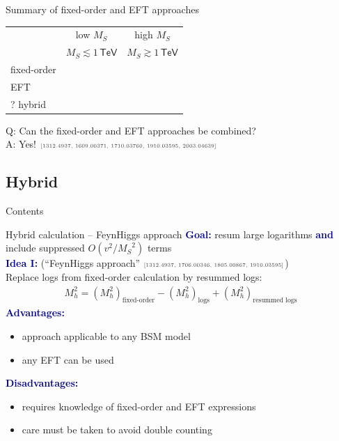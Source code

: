 \documentclass[hyperref={pdfpagelabels=false},ngerman]{beamer}
\newcommand{\cmark}{\ding{51}}%
\newcommand{\xmark}{\ding{55}}%
\newcommand{\eh}[1]{\,\mathsf{#1}}
\newcommand{\ok}{\textcolor{darkgreen}{\cmark}}
\newcommand{\notok}{\textcolor{red}{\xmark}}
\newcommand{\MS}{\ensuremath{M_S}}
\newcommand{\mycite}[1]{\ensuremath{\text{\textcolor{darkgray}{\tiny [#1]}}}}
\renewcommand{\emph}[1]{\textbf{\textcolor{darkblue}{#1}}}
\begin{document}
\begin{frame}{Summary of fixed-order and EFT approaches}
  \begin{center}
    \begin{tabular}{lcc}
      \toprule
                  & low $\MS$ & high $\MS$ \\
                  & $\MS \lesssim 1\eh{TeV}$ & $\MS \gtrsim 1\eh{TeV}$ \\
      \midrule
      fixed-order & \ok       & \notok     \\
      EFT         & \notok    & \ok        \\
      ? hybrid    & \ok       & \ok        \\
      \bottomrule
    \end{tabular}
  \end{center}
  \vspace{2em}
  Q: Can the fixed-order and EFT approaches be combined? \\[1em]
  A: Yes!  \mycite{1312.4937, 1609.00371, 1710.03760, 1910.03595, 2003.04639}
\end{frame}


\subsection{Hybrid}

\begin{frame}{Contents}
\end{frame}

\begin{frame}{Hybrid calculation -- FeynHiggs approach}
  \emph{Goal:} resum large logarithms \emph{and} include suppressed
  $O(v^2/\MS^2)$ terms
  \\[2em]
  \emph{Idea I:} (``FeynHiggs approach'' \mycite{1312.4937, 1706.00346, 1805.00867, 1910.03595})\\
  Replace logs from fixed-order calculation by resummed logs:
  \begin{align*}
    M_h^2 = (M_h^2)_{\text{fixed-order}} - (M_h^2)_{\text{logs}} + (M_h^2)_{\text{resummed logs}}
  \end{align*}
  \emph{Advantages:}
  \begin{itemize}
  \item[\ok] approach applicable to any BSM model
  \item[\ok] any EFT can be used
  \end{itemize}
  \emph{Disadvantages:}
  \begin{itemize}
  \item[\notok] requires knowledge of fixed-order and EFT expressions
  \item[\notok] care must be taken to avoid double counting
  \end{itemize}
\end{frame}
\end{document}
